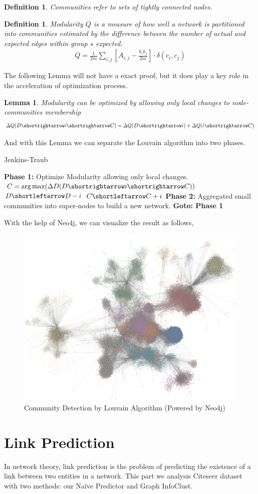 \documentclass[11pt]{article}
\newtheorem{lemma}[theorem]{Lemma}
\newtheorem{definition}[theorem]{Definition}
\DeclareMathOperator*{\argmax}{arg\,max}
\begin{document}
\begin{definition}
	Communities refer to sets of tightly connected nodes.
\end{definition}
\begin{definition}
	Modularity $Q$ is a measure of how well a network is partitioned into communities estimated by the difference between the number of actual and expected edges within group $s$ expected. 
	\begin{align*}
		Q=\frac{1}{2m}\sum_{i,j}[A_{i,j}-\frac{k_ik_j}{2m}]\cdot\delta(c_i,c_j)
	\end{align*}
\end{definition}
The following Lemma will not have a exact proof, but it does play a key role in the acceleration of optimization process.
\begin{lemma}
	Modularity can be optimized by allowing only local changes to node-communities membership
	\begin{align*}
		\Delta Q(D \shortrightarrow i \shortrightarrow C) = \Delta Q(D \shortrightarrow i) + \Delta Q(i \shortrightarrow C)
	\end{align*}
\end{lemma}
And with this Lemma we can separate the Louvain algorithm into two phases.
\begin{algorithm}[H]
	\caption{Jenkins-Traub}
	\begin{algorithmic}
		\State\textbf{Phase 1:} Optimize Modularity allowing only local changes.
		\State$C = \argmax(\Delta D(D \shortrightarrow i \shortrightarrow C))$
		\State$D \shortleftarrow D - {i}$
		\State$C \shortleftarrow C + {i}$
		\State\textbf{Phase 2:} Aggregated small communities into super-nodes to build a new network.
		\State\textbf{Goto: Phase 1}
	\end{algorithmic}
\end{algorithm}

With the help of Neo4j, we can visualize the result as follows,
\begin{figure}[H]
	\centering
	\includegraphics[width=.25\linewidth]{graphs/louvain2.PNG}
	\caption{Community Detection by Louvain Algorithm (Powered by Neo4j)}
\end{figure}
\section{Link Prediction}
In network theory, link prediction is the problem of predicting the existence of a link between two entities in a network. This part we analysis Citeseer dataset with two methods: our Naïve Predictor and Graph InfoClust.
\end{document}
